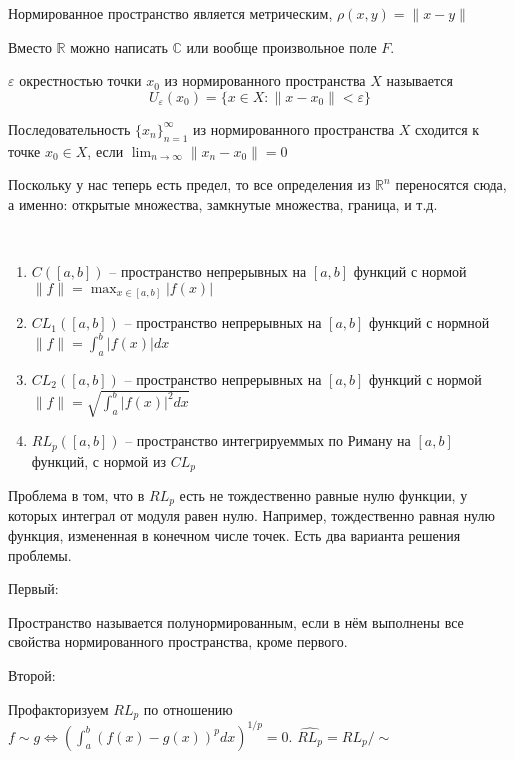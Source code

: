 \documentclass[document.tex]{subfiles}
\begin{document}
\begin{remark}
    Нормированное пространство является метрическим, $\rho(x, y) = \|x - y\|$
\end{remark}

\begin{remark}
    Вместо $\mathbb{R}$ можно написать $\mathbb{C}$ или вообще произвольное поле $F$.
\end{remark}

\begin{definition}
    $\varepsilon$ окрестностью точки $x_0$ из нормированного пространства $X$ называется
    \[
        U_{\varepsilon}(x_0) = \{x \in X : \|x - x_0\| < \varepsilon\}
    \]
\end{definition}

\begin{definition}
    Последовательность $\{x_n\}_{n = 1}^{\infty}$ из нормированного пространства $X$ сходится к точке $x_0 \in X$, если
    $\lim_{n \rightarrow \infty} \|x_n - x_0\| = 0$
\end{definition}

\begin{remark}
    Поскольку у нас теперь есть предел, то все определения из $\mathbb{R}^n$ переносятся сюда, а именно: открытые
    множества, замкнутые множества, граница, и т.д.
\end{remark}

\begin{example}
    ~\begin{enumerate}
        \item $C([a, b])$ -- пространство непрерывных на $[a, b]$ функций с нормой $\|f\| = \max_{x \in [a, b]} |f(x)|$ 
        \item $CL_{1} ([a, b])$ -- пространство непрерывных на $[a, b]$ функций с нормной $\|f\| = \int_{a}^{b} |f(x)| dx$
        \item $CL_{2} ([a, b])$ -- пространство непрерывных на $[a, b]$ функций с нормой $\|f\| = \sqrt{\int_{a}^{b}
            |f(x)|^2 dx}$

        \item $RL_{p} ([a, b])$ -- пространство интегрируеммых по Риману на $[a, b]$ функций, с нормой из $CL_{p}$
    \end{enumerate}
\end{example}

\begin{remark}
    Проблема в том, что в $RL_{p}$ есть не тождественно равные нулю функции, у которых интеграл от модуля равен нулю.
    Например, тождественно равная нулю функция, измененная в конечном числе точек. Есть два варианта решения проблемы.
\end{remark}
Первый:
\begin{definition}
    Пространство называется полунормированным, если в нём выполнены все свойства нормированного пространства, кроме
    первого.
\end{definition}
Второй:
\begin{remark}
    Профакторизуем $RL_{p}$ по отношению $f \sim g \Leftrightarrow \left( \int_{a}^{b} (f(x) - g(x))^p dx \right)^{1/p} = 0$. $\hat {RL_{p}} =
    RL_{p}/\sim$
\end{remark}
\end{document}
